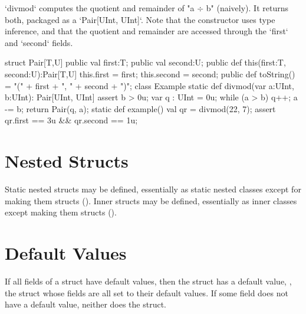 \xcd`divmod` computes the quotient and remainder of \xcdmath"a $\div$ b" (naively).
It returns both, packaged as a \xcd`Pair[UInt, UInt]`.  Note that the
constructor uses type inference, and that the quotient and remainder are
accessed through the \xcd`first` and \xcd`second` fields.
\begin{xten}
struct Pair[T,U] {
    public val first:T;
    public val second:U;
    public def this(first:T, second:U):Pair[T,U] {
        this.first = first;
        this.second = second;
    }
    public def toString() 
        = "(" + first + ", " + second + ")";
}
class Example {
  static def divmod(var a:UInt, b:UInt): Pair[UInt, UInt] {
     assert b > 0u;
     var q : UInt = 0u;
     while (a > b) {q++; a -= b;}
     return Pair(q, a); 
  }
  static def example() {
     val qr = divmod(22, 7);
     assert qr.first == 3u && qr.second == 1u;
  }
}
\end{xten}

\section{Nested Structs}

Static nested structs may be defined, essentially as static nested classes
except for making them structs
().  Inner structs may be defined, essentially as
inner classes except making them structs ().

\section{Default Values}

If all fields of a struct have default values, then the struct has a
      default value, \viz, the struct whose fields are all set to their
      default values.  If some field does not have a default value, neither
      does the struct.

